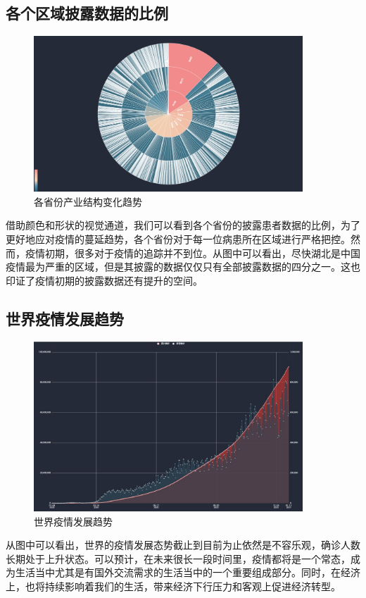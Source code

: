 \documentclass{ctexart}
\begin{document}
\subsection{各个区域披露数据的比例}
\begin{figure}[H]
    \centering
    \includegraphics[width=0.9\textwidth]{img/sunburst}
    \caption{各省份产业结构变化趋势}
    \label{}
\end{figure}
借助颜色和形状的视觉通道，我们可以看到各个省份的披露患者数据的比例，为了更好地应对疫情的蔓延趋势，各个省份对于每一位病患所在区域进行严格把控。然而，疫情初期，很多对于疫情的追踪并不到位。从图中可以看出，尽快湖北是中国疫情最为严重的区域，但是其披露的数据仅仅只有全部披露数据的四分之一。这也印证了疫情初期的披露数据还有提升的空间。
\subsection{世界疫情发展趋势}
\begin{figure}[H]
    \centering
    \includegraphics[width=0.9\textwidth]{img/worldtrend}
    \caption{世界疫情发展趋势}
    \label{}
\end{figure}
从图中可以看出，世界的疫情发展态势截止到目前为止依然是不容乐观，确诊人数长期处于上升状态。可以预计，在未来很长一段时间里，疫情都将是一个常态，成为生活当中尤其是有国外交流需求的生活当中的一个重要组成部分。同时，在经济上，也将持续影响着我们的生活，带来经济下行压力和客观上促进经济转型。
\end{document}
